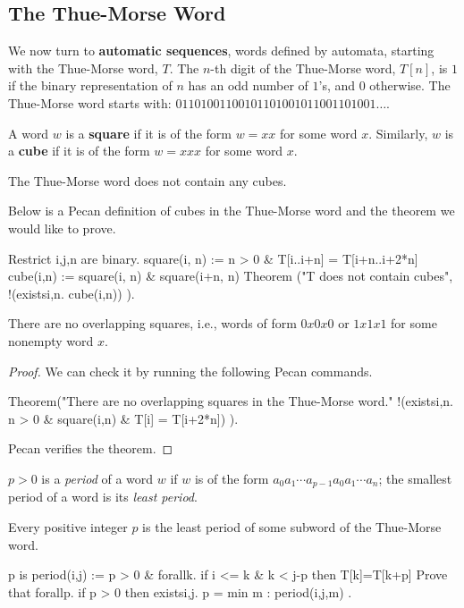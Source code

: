 \documentclass[a4paper,usenames,dvipsnames]{article}
\begin{document}
\subsection{The Thue-Morse Word}

We now turn to \textbf{automatic sequences}, words defined by automata, starting with the Thue-Morse word, $T$. 
The $n$-th digit of the Thue-Morse word, $T[n]$, is $1$ if the binary representation of $n$ has an odd number of $1$'s, and $0$ otherwise.
The Thue-Morse word starts with: $01101001100101101001011001101001\ldots$.

\begin{definition}
    A word $w$ is a \textbf{square} if it is of the form $w = xx$ for some word $x$.
    Similarly, $w$ is a \textbf{cube} if it is of the form $w = xxx$ for some word $x$.
\end{definition}

\begin{theorem}
    The Thue-Morse word does not contain any cubes.
\end{theorem}

Below is a Pecan definition of cubes in the Thue-Morse word and the theorem we would like to prove.
\begin{pecan}
Restrict i,j,n are binary.
square(i, n) := n > 0 & T[i..i+n] = T[i+n..i+2*n]
cube(i,n) := square(i, n) & square(i+n, n)
Theorem ("T does not contain cubes", { !(existsi,n. cube(i,n)) }).
\end{pecan}

\begin{theorem}
    There are no overlapping squares, i.e., words of form $0x0x0$ or $1x1x1$ for some nonempty word $x$. 
\end{theorem}
\begin{proof}
    We can check it by running the following Pecan commands.
\begin{pecan}
Theorem("There are no overlapping squares in the Thue-Morse word."
    { !(existsi,n. n > 0 & square(i,n) & T[i] = T[i+2*n]) }).
\end{pecan}
    Pecan verifies the theorem.
\end{proof}

\begin{definition}
    $p > 0$ is a \emph{period} of a word $w$ if $w$ is of the form $a_0 a_1 \cdots a_{p-1} a_0 a_1 \cdots a_n$; the smallest period of a word is its \emph{least period}.
\end{definition}

\begin{theorem}
    Every positive integer $p$ is the least period of some subword of the Thue-Morse word.
\end{theorem}
\begin{pecan}
p is period(i,j) := p > 0 &
    forallk. if i <= k & k < j-p then T[k]=T[k+p]
Prove that {
    forallp. if p > 0 then 
        existsi,j. p = min { m : period(i,j,m) }
}.
\end{pecan}
\end{document}

